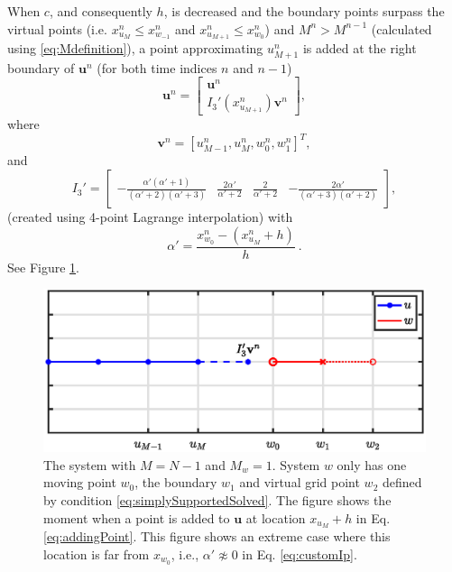 \documentclass[dvipsnames, reprint]{JASA}
\def\SWcomment[#1]{\textcolor{Bittersweet}{#1}}
\begin{document}
When $c$, and consequently $h$, is decreased and the boundary points surpass the virtual points (i.e. $x^n_{u_M} \leq x^n_{w_{-1}}$ and $x^n_{u_{M+1}} \leq x^n_{w_0}$) and $M^n > M^{n-1}$ (calculated using \eqref{eq:Mdefinition}), a point approximating $u_{M+1}^n$ is added at the right boundary of $\mathbf{u}^n$ (for both time indices $n$ and $n-1$)
\begin{equation}\label{eq:addingPoint}
       \mathbf{u}^n = \begin{bmatrix}
       \mathbf{u}^n\\ I_3'(x^n_{u_{M+1}})\mathbf{v}^n
       \end{bmatrix},
\end{equation}
where
\begin{equation*}
\mathbf{v}^n = [u_{M-1}^n, u_M^n, w_0^n, w_1^n]^T, 
\end{equation*}
and
\begin{equation}\label{eq:customIp}
    I_3' = \begin{bmatrix} -\frac{\alpha'(\alpha'+1)}{(\alpha'+2)(\alpha'+3)} &\frac{2\alpha'}{\alpha'+2} &\frac{2}{\alpha'+2} 
    &-\frac{2\alpha'}{(\alpha'+3)(\alpha'+2)}
    \end{bmatrix},
\end{equation}
\SWcomment[(created using 4-point Lagrange interpolation)] with
\begin{equation}
    \alpha' = \frac{x^n_{w_0} - (x^n_{u_M} + h)}{h}\ .\nonumber
\end{equation}  
See Figure \ref{fig:addingPoint}.

\begin{figure}[ht]
\includegraphics[width=\reprintcolumnwidth]{addingGridPoint2}
\caption{\label{fig:addingPoint}{The system with $M = N-1$ and $M_w = 1$. System $w$ only has one moving point $w_0$, the boundary $w_1$ and virtual grid point $w_2$ defined by condition \eqref{eq:simplySupportedSolved}. The figure shows the moment when a point is added to $\mathbf{u}$ at location $x_{u_M} + h$ in Eq. \eqref{eq:addingPoint}. This figure shows an extreme case where this location is far from $x_{w_0}$, i.e., $\alpha' \not\approx 0$ in Eq. \eqref{eq:customIp}.}}
\end{figure} 
\end{document}
